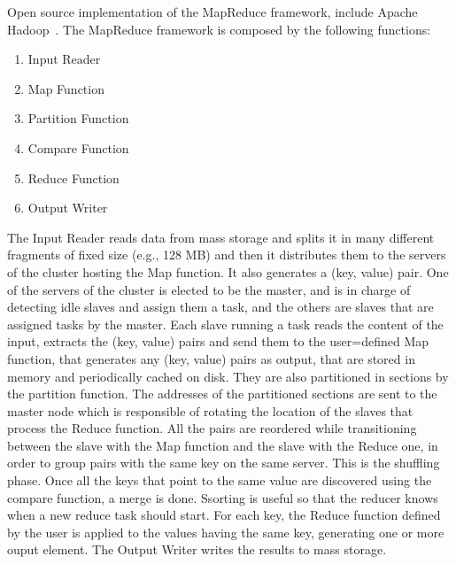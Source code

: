 Open source implementation of the MapReduce framework, include Apache Hadoop~\cite{misc:ApacheHadoop}. 
The MapReduce framework is composed by the following functions:
\begin{enumerate}
	\item Input Reader
	\item Map Function
	\item Partition Function
	\item Compare Function
	\item Reduce Function
	\item Output Writer
\end{enumerate}

The Input Reader reads data from mass storage and splits it in many different fragments of fixed size (e.g., 128 MB) and then it distributes them to the servers of the cluster hosting the Map function. It also generates a (key, value) pair. One of the servers of the cluster is elected to be the master, and is in charge of detecting idle slaves and assign them a task, and the others are slaves that are assigned tasks by the master. Each slave running a task reads the content of the input, extracts the (key, value) pairs and send them to the user=defined Map function, that generates any (key, value) pairs as output, that are stored in memory and periodically cached on disk. They are also partitioned in sections by the partition function. The addresses of the partitioned sections are sent to the master node which is responsible of rotating the location of the slaves that process the Reduce function. All the pairs are reordered while transitioning between the slave with the Map function and the slave with the Reduce one, in order to group pairs with the same key on the same server. This is the shuffling phase. Once all the keys that point to the same value are discovered using the compare function, a merge is done. Ssorting is useful so that the reducer knows when a new reduce task should start. For each key, the Reduce function defined by the user is applied to the values having the same key, generating one or more ouput element. The Output Writer writes the results to mass storage.
